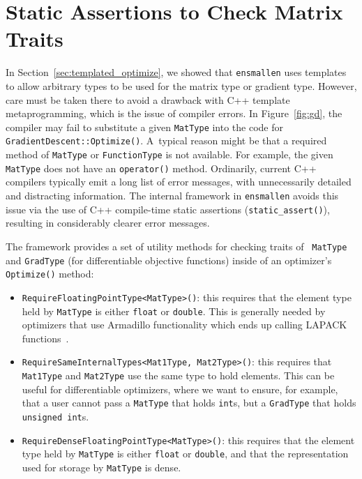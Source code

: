 \section{Static Assertions to Check Matrix Traits}
\label{sec:templated_optimize_details}

In Section~\ref{sec:templated_optimize}, we showed that {\tt ensmallen} uses
templates to allow arbitrary types to be used for the matrix type or gradient
type.
However, care must be taken there to avoid a drawback with C++ template metaprogramming,
which is the issue of compiler errors.
In Figure~\ref{fig:gd}, the compiler may fail to substitute a given {\tt MatType}
into the code for {\tt GradientDescent::Optimize()}. A~typical reason might be that
a required method of {\tt MatType} or {\tt FunctionType} is not available.
For example, the given {\tt MatType} does not have an {\tt operator\*()} method.
Ordinarily, current C++ compilers typically emit a long list of error messages,
with unnecessarily detailed and distracting information.
The internal framework in {\tt ensmallen} avoids this issue via the use of
C++ compile-time static assertions ({\tt static\_assert()}),
resulting in considerably clearer error messages.

The framework provides a set of utility methods for checking traits of {\tt
MatType} and {\tt GradType} (for differentiable objective functions) inside of
an optimizer's {\tt Optimize()} method:

\begin{itemize}
  \item {\tt RequireFloatingPointType<MatType>()}: this requires that the
element type held by {\tt MatType} is either {\tt float} or {\tt double}.
This is generally needed by optimizers that use Armadillo functionality which
ends up calling LAPACK functions~\cite{anderson1999lapack}.

  \item {\tt RequireSameInternalTypes<Mat1Type, Mat2Type>()}: this requires that
{\tt Mat1Type} and {\tt Mat2Type} use the same type to hold elements.  This can
be useful for differentiable optimizers, where we want to ensure, for example,
that a user cannot pass a {\tt MatType} that holds {\tt int}s, but a {\tt GradType} that
holds {\tt unsigned int}s.

  \item {\tt RequireDenseFloatingPointType<MatType>()}: this requires that the
element type held by {\tt MatType} is either {\tt float} or {\tt double}, and
that the representation used for storage by {\tt MatType} is dense.
\end{itemize}

